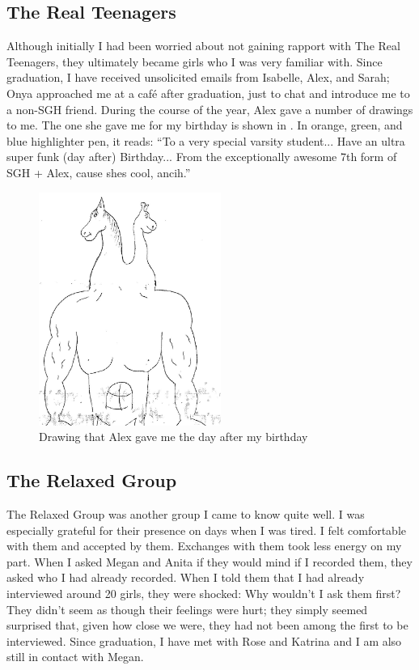 \subsection{The Real Teenagers}
Although initially I had been worried about not gaining rapport with The Real Teenagers, they ultimately became girls who I was very familiar with. Since graduation, I have received unsolicited emails from Isabelle, Alex, and Sarah; Onya approached me at a caf\'e after graduation, just to chat and introduce me to a non-SGH friend. During the course of the year, Alex gave a number of drawings to me. The one she gave me for my birthday is shown in . In orange, green, and blue highlighter pen, it reads: ``To a very special varsity student... Have an ultra super funk (day after) Birthday... From the exceptionally awesome 7th form of SGH + Alex, cause shes cool, ancih.''


\begin{figure}
	\centering
		\includegraphics[height=3in]{images/bdaydrawingfromAlex.jpg}
	\caption{Drawing that Alex gave me the day after my birthday}
	\label{fig:bdaydrawing}
\end{figure}


\subsection{The Relaxed Group}
The Relaxed Group was another group I came to know quite well. I was especially grateful for their presence on days when I was tired. I felt comfortable with them and accepted by them. Exchanges with them took less energy on my part. When I asked Megan and Anita if they would mind if I recorded them, they asked who I had already recorded. When I told them that I had already interviewed around 20 girls, they were shocked: Why wouldn't I ask them first?  They didn't seem as though their feelings were hurt; they simply seemed surprised that, given how close we were, they had not been among the first to be interviewed. Since graduation, I have met with Rose and Katrina and I am also still in contact with Megan.

